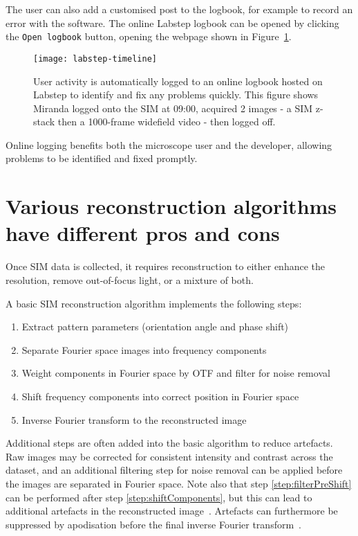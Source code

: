 The user can also add a customised post to the logbook, for example to record an error with the software. 
The online Labstep logbook can be opened by clicking the \texttt{Open logbook} button, opening the webpage shown in Figure~\ref{fig:labstepTimeline}. 

\begin{figure}[htbp!]
\centering
\texttt{[image: labstep-timeline]}
\caption[LAG SIM: Logging user activity with Labstep allows any problems to be identified and fixed quickly]{User activity is automatically logged to an online logbook hosted on Labstep to identify and fix any problems quickly. This figure shows Miranda logged onto the SIM at 09:00, acquired 2 images - a SIM z-stack then a 1000-frame widefield video - then logged off.}
\label{fig:labstepTimeline}
\end{figure}

Online logging benefits both the microscope user and the developer, allowing problems to be identified and fixed promptly. 


\section{Various reconstruction algorithms have different pros and cons} \label{sec:recon}
Once SIM data is collected, it requires reconstruction to either enhance the resolution, remove out-of-focus light, or a mixture of both.

A basic SIM reconstruction algorithm implements the following steps:
\begin{enumerate}
	\item Extract pattern parameters (orientation angle and phase shift)
	\item Separate Fourier space images into frequency components
	\item \label{step:filterPreShift}Weight components in Fourier space by OTF and filter for noise removal
	\item \label{step:shiftComponents}Shift frequency components into correct position in Fourier space
	\item Inverse Fourier transform to the reconstructed image
\end{enumerate}

Additional steps are often added into the basic algorithm to reduce artefacts. 
Raw images may be corrected for consistent intensity and contrast across the dataset, and an additional filtering step for noise removal can be applied before the images are separated in Fourier space. 
Note also that step \ref{step:filterPreShift} can be performed after step \ref{step:shiftComponents}, but this can lead to additional artefacts in the reconstructed image~\cite{gustafsson2008three}. 
Artefacts can furthermore be suppressed by apodisation before the final inverse Fourier transform~\cite{gustafsson2008three}. 

